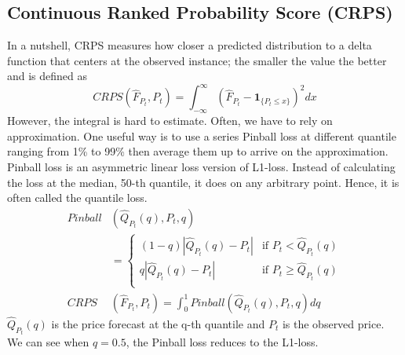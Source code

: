 \documentclass[11pt, letterpaper, journal]{IEEEtran}
\begin{document}
\subsection{Continuous Ranked Probability Score (CRPS)}
In a nutshell, CRPS measures how closer a predicted distribution to a delta function that centers at the observed instance; the smaller the value the better and is defined as $$CRPS(\hat{F}_{P_t}, P_t) = \int_{-\infty}^{\infty} (\hat{F}_{P_t} - \mathbf{1}_{\{P_t \leq x\}})^2 dx$$ However, the integral is hard to estimate. Often, we have to rely on approximation. One useful way is to use a series Pinball loss at different quantile ranging from 1\% to 99\% then average them up to arrive on the approximation. Pinball loss is an asymmetric linear loss version of L1-loss. Instead of calculating the loss at the median, 50-th quantile, it does on any arbitrary point. Hence, it is often called the quantile loss.
\begin{align*}
    Pinball&(\hat{Q}_{P_t}(q), P_t, q) \\&= \begin{cases}
        (1-q) |\hat{Q}_{P_t}(q) - P_t| & \text{if $P_t < \hat{Q}_{P_t}(q)$} \\
        q |\hat{Q}_{P_t}(q) - P_t| & \text{if $P_t \geq \hat{Q}_{P_t}(q)$} \\
    \end{cases} \\
    CRPS&(\hat{F}_{P_t}, P_t) = \int_{0}^{1} Pinball(\hat{Q}_{P_t}(q), P_t, q) dq
\end{align*}
$\hat{Q}_{P_t}(q)$ is the price forecast at the q-th quantile and $P_t$ is the observed price. We can see when $q=0.5$, the Pinball loss reduces to the L1-loss.
\end{document}
